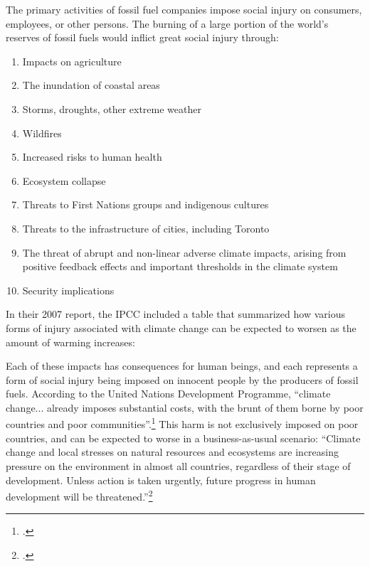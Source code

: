 The primary activities of fossil fuel companies impose social injury on consumers, employees, or other persons.
The burning of a large portion of the world's reserves of fossil fuels would inflict great social injury through:
\begin{enumerate}
\item Impacts on agriculture
\item The inundation of coastal areas
\item Storms, droughts, other extreme weather
\item Wildfires
\item Increased risks to human health
\item Ecosystem collapse 
\item Threats to First Nations groups and indigenous cultures
\item Threats to the infrastructure of cities, including Toronto
\item The threat of abrupt and non-linear adverse climate impacts, arising from positive feedback effects and important thresholds in the climate system
\item Security implications
\end{enumerate}
In their 2007 report, the IPCC included a table that summarized how various forms of injury associated with climate change can be expected to worsen as the amount of warming increases:


Each of these impacts has consequences for human beings, and each represents a form of social injury being imposed on innocent people by the producers of fossil fuels.
According to the United Nations Development Programme, ``climate change... already imposes substantial costs, with the brunt of them borne by poor countries and poor communities''.\footcite[][p. 34]{UNHumanDev2013}
This harm is not exclusively imposed on poor countries, and can be expected to worse in a business-as-usual scenario: ``Climate change and local stresses on natural resources and ecosystems are increasing pressure on the environment in almost all countries, regardless of their stage of development. Unless action is taken urgently, future progress in human development will be threatened.''\footcite[][p. 87]{UNHumanDev2013}



